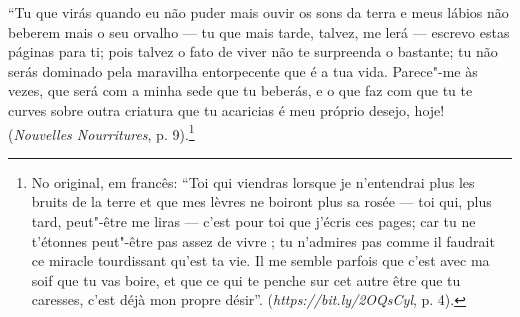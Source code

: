 ``Tu que virás quando eu não puder mais ouvir os sons da terra e meus
lábios não beberem mais o seu orvalho --- tu que mais tarde, talvez, me
lerá --- escrevo estas páginas para ti; pois talvez o fato de viver não te
surpreenda o bastante; tu não serás dominado pela maravilha entorpecente
que é a tua vida. Parece"-me às vezes, que será com a minha sede que tu
beberás, e o que faz com que tu te curves sobre outra criatura que tu
acaricias é meu próprio desejo, hoje! (\emph{Nouvelles Nourritures}, p.
9).\footnote{No original, em francês: ``Toi qui viendras lorsque je
  n'entendrai plus les bruits de la terre et que mes lèvres ne boiront
  plus sa rosée --- toi qui, plus tard, peut"-être me liras --- c'est pour
  toi que j'écris ces pages; car tu ne t'étonnes peut"-être pas assez de
  vivre ; tu n'admires pas comme il faudrait ce miracle tourdissant
  qu'est ta vie. Il me semble parfois que c'est avec ma soif que tu vas
  boire, et que ce qui te penche sur cet autre être que tu caresses,
  c'est déjà mon propre désir''.
  (\emph{https://bit.ly/2OQsCyl}, p. 4). \versal{[N. T.]}} \enlargethispage{-\baselineskip}
